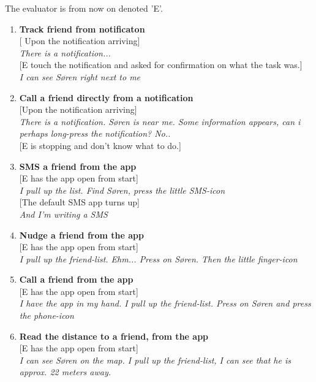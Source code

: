 \documentclass[runningheads,a4paper]{llncs}
\begin{document}
The evaluator is from now on denoted 'E'. \\
\begin{enumerate}
	\item \textbf{Track friend from notificaton}\\
		{[} Upon the notification arriving{]} \\
		\textit{There is a notification...}\\
		{[}E touch the notification and asked for confirmation on what the task was.{]}\\
		\textit{I can see Søren right next to me}\\
		
	\item \textbf{Call a friend directly from a notification}\\
		{[}Upon the notification arriving{]} \\
		\textit{There is a notification. Søren is near me. Some information appears, can i perhaps long-press the notification? No..}\\
		
		{[}E is stopping and don't know what to do.{]}\\
	
	\item \textbf{SMS a friend from the app}\\
		{[}E has the app open from start{]}\\
		\textit{I pull up the list. Find Søren, press the little SMS-icon}\\
		{[}The default SMS app turns up{]}\\
		\textit{And I'm writing a SMS}\\
		
	\item \textbf{Nudge a friend from the app}\\
		{[}E has the app open from start{]}\\
		\textit{I pull up the friend-list. Ehm... Press on Søren. Then the little finger-icon}\\
		
	\item \textbf{Call a friend from the app}\\
		{[}E has the app open from start{]}\\
		\textit{I have the app in my hand. I pull up the friend-list. Press on Søren and press the phone-icon}\\
		
	\item \textbf{Read the distance to a friend, from the app}\\
		{[}E has the app open from start{]}\\
		\textit{I can see Søren on the map. I pull up the friend-list, I can see that he is approx. 22 meters away.}\\
		

\end{enumerate}
\end{document}
